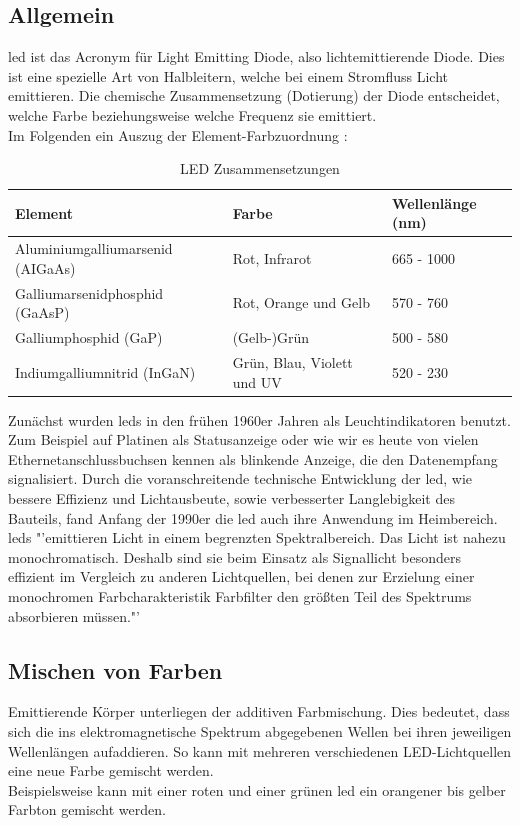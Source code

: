 \documentclass[11pt]{scrartcl}
\begin{document}
\subsection{Allgemein}
\ac{led} ist das Acronym für Light Emitting Diode, also lichtemittierende Diode. Dies ist eine spezielle Art von Halbleitern,
welche bei einem Stromfluss Licht emittieren. Die chemische Zusammensetzung (Dotierung) der Diode entscheidet, welche Farbe
beziehungsweise welche Frequenz sie emittiert.\\
Im Folgenden ein Auszug der Element-Farbzuordnung \cite{wikiLed}:
\begin{table}[H]
    \small
    \begin{tabularx}{\textwidth}{|l|l|X|}
        \hline Element & Farbe & Wellenlänge (nm)\\\hline
        Aluminiumgalliumarsenid (AIGaAs) & Rot, Infrarot & 665 - 1000\\\hline
        Galliumarsenidphosphid (GaAsP) & Rot, Orange und Gelb & 570 - 760\\\hline
        Galliumphosphid (GaP) & (Gelb-)Grün & 500 - 580\\\hline
        Indiumgalliumnitrid (InGaN) &  Grün, Blau, Violett und UV & 520 - 230\\\hline
    \end{tabularx}
    \caption{LED Zusammensetzungen}
\end{table}
\noindent
Zunächst wurden \ac{led}s in den frühen 1960er Jahren als Leuchtindikatoren benutzt. Zum Beispiel auf Platinen als Statusanzeige oder wie
wir es heute von vielen Ethernetanschlussbuchsen kennen als blinkende Anzeige, die den Datenempfang signalisiert. Durch die
voranschreitende technische Entwicklung der \ac{led}, wie bessere Effizienz und Lichtausbeute, sowie verbesserter Langlebigkeit
des Bauteils, fand Anfang der 1990er die \ac{led} auch ihre Anwendung im Heimbereich.\\
\ac{led}s "'emittieren Licht in einem begrenzten Spektralbereich. Das Licht ist nahezu monochromatisch. Deshalb sind sie beim Einsatz als
Signallicht besonders effizient im Vergleich zu anderen Lichtquellen, bei denen zur Erzielung einer monochromen Farbcharakteristik
Farbfilter den größten Teil des Spektrums absorbieren müssen."'\\
\cite{wikiLed}

\subsection{Mischen von Farben}\label{colormixing}
Emittierende Körper unterliegen der additiven Farbmischung. Dies bedeutet, dass sich die ins elektromagnetische Spektrum abgegebenen
Wellen bei ihren jeweiligen Wellenlängen aufaddieren. So kann mit mehreren verschiedenen LED-Lichtquellen eine neue Farbe gemischt
werden.\\
Beispielsweise kann mit einer roten und einer grünen \ac{led} ein orangener bis gelber Farbton gemischt werden.
\end{document}
